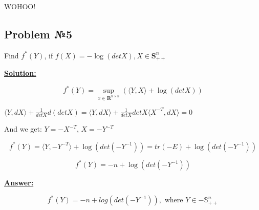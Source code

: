 WOHOO!

\subsection{Problem №5}
Find $f^*(Y)$, if $f(X) = -\log( det X), X \in \mathbf{S}_{++}^n$

\underline{\textbf{Solution:}}

\begin{equation*}
    f^*(Y) = \sup_{x \in \mathbf{R}^{n \times n}} \left( \langle Y, X \rangle + \log(detX) \right)
\end{equation*}

$\langle Y, dX \rangle + \frac{1}{detX}d(detX) = \langle Y, dX \rangle + \frac{1}{detX}detX \langle X^{-T}, dX \rangle = 0$

And we get: $Y = - X^{-T}$, $X = -Y^{-T}$

\begin{equation*}
    f^*(Y) = \langle Y, - Y^{-T} \rangle + \log(det(-Y^{-1})) = tr(-E) + \log \left(det(-Y^{-1}) \right)
\end{equation*}

\begin{equation*}
    f^*(Y) = -n + \log \left(det(-Y^{-1}) \right)
\end{equation*}

\underline{\textbf{Answer:}}

\begin{equation*}
    f^*(Y) = -n + log(det(-Y^{-1})), \text{ where } Y \in -\mathds{S}_{++}^n
\end{equation*}